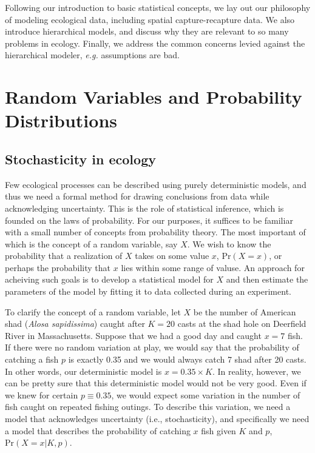 Following our introduction to basic statistical concepts, we lay out our
philosophy of modeling ecological data, including spatial
capture-recapture data. We also introduce hierarchical
models, and discuss why they are relevant to so many problems in
ecology. Finally, we address the common concerns levied against the
hierarchical modeler, \emph{e.g.} assumptions are bad.

\section{Random Variables and Probability Distributions}

\subsection{Stochasticity in ecology}


Few ecological processes can be described using purely deterministic
models, and thus we need a formal method for drawing conclusions from data while
acknowledging uncertainty. This is the role of statistical inference,
which is founded on the laws of probability. For our purposes, it
suffices to be familiar with a small number of concepts from
probability theory. The most important of which is the concept of a random
variable, say $X$. We wish to know the probability that a realization
of $X$ takes on some value $x$, %
$\text{Pr}(X=x)$, or perhaps the probability that $x$ lies within some
range of valuse. An approach for acheiving such goals is to develop a
statistical model for $X$ and then estimate the parameters of the
model by fitting it to data collected during an experiment.

To clarify the concept of a random variable, let $X$ be the number of
American shad (\emph{Alosa sapidissima}) caught after $K=20$ casts at
the shad hole on Deerfield River in Massachusetts. Suppose that
we had a good day and caught $x=7$ fish. If there were no random
variation at play, we would say that the probability of catching a
fish $p$ is exactly 0.35 and we would always catch 7 shad after 20
casts. In other words, our deterministic model is $x =
0.35\times K$. In reality, however, we can be pretty sure that this
deterministic model would not be very good. Even if we knew for
certain $p \equiv 0.35$, we would expect some variation in the number
of fish caught on repeated fishing outings. To describe this
variation, we need a model that acknowledges uncertainty (i.e.,
stochasticity), and specifically we need a model that describes the
probability of catching $x$ fish given $K$ and $p$,
$\text{Pr}(X=x|K,p)$.

